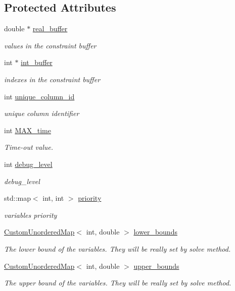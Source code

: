\subsection*{Protected Attributes}
\begin{DoxyCompactItemize}
\item 
double $\ast$ \hyperlink{classmeilp__solver_a58182e78e73639b546873ad280000ea3}{real\+\_\+buffer}
\begin{DoxyCompactList}\small\item\em values in the constraint buffer \end{DoxyCompactList}\item 
int $\ast$ \hyperlink{classmeilp__solver_a3a2c69fb4724141d6af37b718bc89275}{int\+\_\+buffer}
\begin{DoxyCompactList}\small\item\em indexes in the constraint buffer \end{DoxyCompactList}\item 
int \hyperlink{classmeilp__solver_aa9606e3ca41bb53c9bb1bbc1d61d5a64}{unique\+\_\+column\+\_\+id}
\begin{DoxyCompactList}\small\item\em unique column identifier \end{DoxyCompactList}\item 
int \hyperlink{classmeilp__solver_aa0beb16cba6ab7284e2d072e3627ae0e}{M\+A\+X\+\_\+time}
\begin{DoxyCompactList}\small\item\em Time-\/out value. \end{DoxyCompactList}\item 
int \hyperlink{classmeilp__solver_a9cef2504893ac9d062bfba3c5ebbf0bf}{debug\+\_\+level}
\begin{DoxyCompactList}\small\item\em debug\+\_\+level \end{DoxyCompactList}\item 
std\+::map$<$ int, int $>$ \hyperlink{classmeilp__solver_a61dba558fd122faf65d84c0946b71fcd}{priority}
\begin{DoxyCompactList}\small\item\em variables priority \end{DoxyCompactList}\item 
\hyperlink{custom__map_8hpp_ad1ed68f2ff093683ab1a33522b144adc}{Custom\+Unordered\+Map}$<$ int, double $>$ \hyperlink{classmeilp__solver_ab8b85ba238c96c08cf614258c98dc2c5}{lower\+\_\+bounds}
\begin{DoxyCompactList}\small\item\em The lower bound of the variables. They will be really set by solve method. \end{DoxyCompactList}\item 
\hyperlink{custom__map_8hpp_ad1ed68f2ff093683ab1a33522b144adc}{Custom\+Unordered\+Map}$<$ int, double $>$ \hyperlink{classmeilp__solver_a4b36c84aa8584c2d66dbfa885fe49214}{upper\+\_\+bounds}
\begin{DoxyCompactList}\small\item\em The upper bound of the variables. They will be really set by solve method. \end{DoxyCompactList}\end{DoxyCompactItemize}
